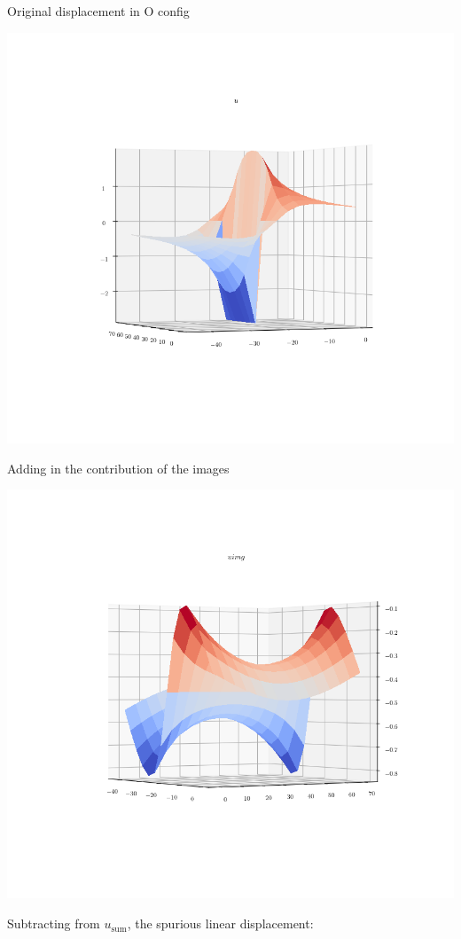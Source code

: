 \documentclass[11pt]{article}
\begin{document}
\begin{enumerate}
Original displacement in O config
 \begin{center}
\includegraphics[width=.9\linewidth]{Images/u_dipole_O_arrangement_non_periodic_displacement.png}
\end{center}
Adding in the contribution of the images
\begin{center}
\includegraphics[width=.9\linewidth]{Images/u_image_dipole_O_arrangement.png}
\end{center}
Subtracting from \(u_{\text{sum}}\), the spurious linear displacement:
\begin{center}

\end{center}
\end{enumerate}
\end{document}
